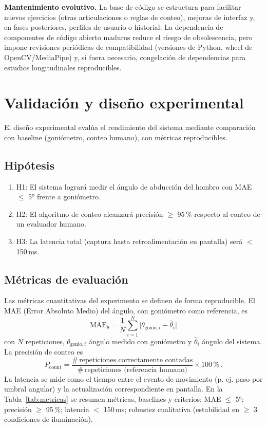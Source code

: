 \documentclass[11pt,a4paper]{article}
\begin{document}
\textbf{Mantenimiento evolutivo.} La base de código se estructura para facilitar nuevos ejercicios (otras articulaciones o reglas de conteo), mejoras de interfaz y, en fases posteriores, perfiles de usuario o historial. La dependencia de componentes de código abierto maduros reduce el riesgo de obsolescencia, pero impone revisiones periódicas de compatibilidad (versiones de Python, wheel de OpenCV/MediaPipe) y, si fuera necesario, congelación de dependencias para estudios longitudinales reproducibles.

\clearpage
{}
\section{Validación y diseño experimental}

El diseño experimental evalúa el rendimiento del sistema mediante comparación con baseline (goniómetro, conteo humano), con métricas reproducibles.

\subsection{Hipótesis}
\begin{enumerate}
  \item H1: El sistema logrará medir el ángulo de abducción del hombro con MAE $\leq$ 5° frente a goniómetro.
  \item H2: El algoritmo de conteo alcanzará precisión $\geq$ 95\,\% respecto al conteo de un evaluador humano.
  \item H3: La latencia total (captura hasta retroalimentación en pantalla) será $<$ 150\,ms.
\end{enumerate}

\subsection{Métricas de evaluación}
Las métricas cuantitativas del experimento se definen de forma reproducible. El MAE (Error Absoluto Medio) del ángulo, con goniómetro como referencia, es
\begin{equation}
  \mathrm{MAE}_\theta = \frac{1}{N} \sum_{i=1}^{N} \bigl| \theta_{\mathrm{gonio},i} - \hat{\theta}_i \bigr|
\end{equation}
con $N$ repeticiones, $\theta_{\mathrm{gonio},i}$ ángulo medido con goniómetro y $\hat{\theta}_i$ ángulo del sistema. La precisión de conteo es
\begin{equation}
  P_{\mathrm{count}} = \frac{\#\,\text{repeticiones correctamente contadas}}{\#\,\text{repeticiones (referencia humano)}} \times 100\,\text{\%}\,.
\end{equation}
La latencia se mide como el tiempo entre el evento de movimiento (p. ej. paso por umbral angular) y la actualización correspondiente en pantalla. En la Tabla~\ref{tab:metricas} se resumen métricas, baselines y criterios: MAE $\leq$ 5°; precisión $\geq$ 95\,\%; latencia $<$ 150\,ms; robustez cualitativa (estabilidad en $\geq$ 3 condiciones de iluminación).
\end{document}
